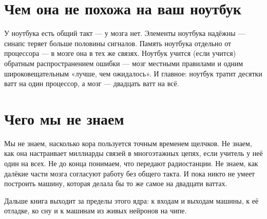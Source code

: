 \section*{Чем она не похожа на ваш ноутбук}

У ноутбука есть общий такт --- у мозга нет. Элементы ноутбука надёжны --- синапс теряет больше половины сигналов. Память ноутбука отдельно от процессора --- в мозге она в тех же связях. Ноутбук учится (если учится) обратным распространением ошибки --- мозг местными правилами и одним широковещательным «лучше, чем ожидалось». И главное: ноутбук тратит десятки ватт на один процессор, а мозг --- двадцать ватт на всё.

\section*{Чего мы не знаем}

Мы не знаем, насколько кора пользуется точным временем щелчков. Не знаем, как она настраивает миллиарды связей в многоэтажных цепях, если учитель у неё один на всех. Не до конца понимаем, что передают радиостанции. Не знаем, как далёкие части мозга согласуют работу без общего такта. И пока никто не умеет построить машину, которая делала бы то же самое на двадцати ваттах.

Дальше книга выходит за пределы этого ядра: к входам и выходам машины, к её отладке, ко сну и к машинам из живых нейронов на чипе.

